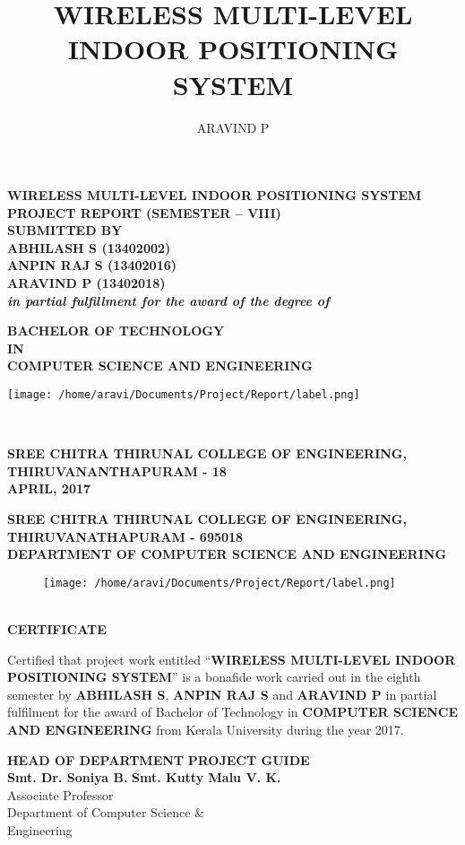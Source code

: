 \documentclass[a4paper,12pt]{report}
\title{WIRELESS MULTI-LEVEL INDOOR POSITIONING SYSTEM}
\author{ARAVIND P}
\newcommand*{\plogo}{
    \texttt{[image: /home/aravi/Documents/Project/Report/label.png]} %
    \iffalse
      \texttt{[image: /home/aravi/Documents/Project/Report/label.png]} %
    \fi
}
\newcommand*{\titleGP}{\begingroup %
\centering %
\vspace*{-25pt} %

\textbf{
{\LARGE WIRELESS MULTI-LEVEL INDOOR POSITIONING SYSTEM}\\[\baselineskip] %
}
\textbf{PROJECT REPORT (SEMESTER – VIII)}\\
[\baselineskip]
\textbf{SUBMITTED BY}\\
[\baselineskip]
\textbf{ABHILASH S (13402002)}\\
\textbf{ANPIN RAJ S (13402016)}\\
\textbf{ARAVIND P (13402018)}\\
[\baselineskip]
\textbf{\textit{in partial fulfillment for the award of the degree of}}\\
[\baselineskip]



{\Large \textbf{BACHELOR OF TECHNOLOGY} \\ \textbf{IN} \\ \textbf{COMPUTER SCIENCE AND ENGINEERING}\\ \par} %


\vspace*{1cm}%

\plogo \\[0.1\baselineskip] %

\vspace*{1cm}

{\large \textbf{SREE CHITRA THIRUNAL COLLEGE OF ENGINEERING,}\\
\textbf{THIRUVANANTHAPURAM - 18}\\
\textbf{APRIL, 2017}\\[\baselineskip]}\par %
\newpage
\endgroup}
\begin{document}
 

\pagestyle{empty} %
\titleGP %


\begin{center}
  \textbf{\large SREE CHITRA THIRUNAL COLLEGE OF ENGINEERING,}\\
  
  \textbf{THIRUVANATHAPURAM - 695018}\\

  \textbf{DEPARTMENT OF COMPUTER SCIENCE AND ENGINEERING}
  \newline
  \begin{figure}[h!]
    \begin{center}
    	\plogo
    \end{center}
  \end{figure}
  \\[0.3\baselineskip]
  
  \Large \textbf{CERTIFICATE}\\
  [\baselineskip]
  \end{center}
  \par 
  Certified that project work entitled “\textbf{WIRELESS MULTI-LEVEL INDOOR POSITIONING SYSTEM}” is a bonafide work carried out in the eighth semester by \textbf{ABHILASH S}, \textbf{ANPIN RAJ S} and \textbf{ARAVIND P} in partial fulfilment for the award of Bachelor of Technology in \textbf{COMPUTER SCIENCE AND ENGINEERING} from Kerala University during the year 2017.

  \vspace{2cm}
  
  \begin{flushleft}
  	\textbf{HEAD OF DEPARTMENT} \hspace{3.5cm}\textbf{PROJECT GUIDE} \\
  	\textbf{Smt. Dr. Soniya B.} \hspace{5.25cm}\textbf{Smt. Kutty Malu V. K. } \\
  	{Associate Professor} \hspace{5.8cm}{Assistant Professor} \\
  	{Department of Computer Science \& \hspace{2.8cm}{Department of Computer Science \&}} \\
  	{Engineering} \hspace{7.15cm}{Engineering}
  \end{flushleft}
  
  \vspace{2cm}
  
\end{document}
